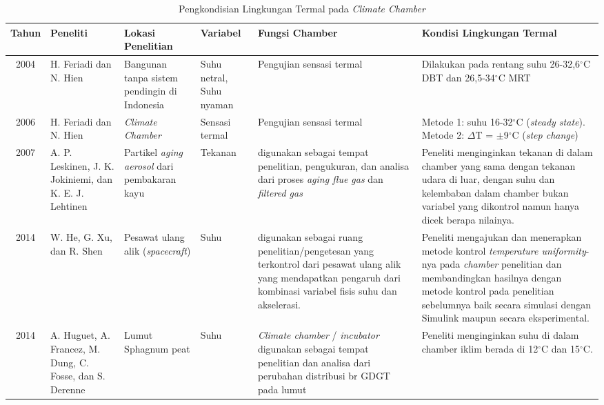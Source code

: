 \begin{landscape}
	\begin{table}[t]
		\caption{Pengkondisian Lingkungan Termal pada \textit{Climate Chamber}}
		\centering
		\label{tbl:2:studichamber}
		\begin{tabular}{|c|p{2.6cm}|p{3cm}|p{2.3cm}|p{5.5cm}|p{5.5cm}|}
			\hline
			Tahun & Peneliti & Lokasi Penelitian & Variabel & Fungsi Chamber & Kondisi Lingkungan Termal \\ \hline
			
			2004 \cite{article2.1:1} & H. Feriadi dan N. Hien & Bangunan tanpa sistem pendingin di Indonesia & Suhu netral, Suhu nyaman & Pengujian sensasi termal & Dilakukan pada rentang suhu 26-32,6$^{\circ}$C DBT dan 26,5-34$^{\circ}$C MRT \\ \hline
			
			2006 \cite{article2.1:2} & H. Feriadi dan N. Hien & \textit{Climate Chamber} & Sensasi termal & Pengujian sensasi termal & Metode 1: suhu 16-32$^{\circ}$C (\textit{steady state}). Metode 2: $\Delta$T = $\pm$9$^{\circ}$C (\textit{step change}) \\ \hline
			
			2007 \cite{article2.1:4} & A. P. Leskinen, J. K. Jokiniemi, dan K. E. J. Lehtinen & Partikel \textit{aging aerosol} dari pembakaran kayu & Tekanan & digunakan sebagai tempat penelitian, pengukuran, dan analisa dari proses \textit{aging flue gas} dan \textit{filtered gas} & Peneliti menginginkan tekanan di dalam chamber yang sama dengan tekanan udara di luar, dengan suhu dan kelembaban dalam chamber bukan variabel yang dikontrol namun hanya dicek berapa nilainya. \\ \hline
			
			2014 \cite{article2.1:5} & W. He, G. Xu, dan R. Shen & Pesawat ulang alik (\textit{spacecraft}) & Suhu & digunakan sebagai ruang penelitian/pengetesan yang terkontrol dari pesawat ulang alik yang mendapatkan pengaruh dari kombinasi variabel fisis suhu dan akselerasi. & Peneliti mengajukan dan menerapkan metode kontrol \textit{temperature uniformity}-nya pada \textit{chamber} penelitian dan membandingkan hasilnya dengan metode kontrol pada penelitian sebelumnya baik secara simulasi dengan Simulink maupun secara eksperimental. \\ \hline
			
			2014 \cite{article2.1:6} & A. Huguet, A. Francez, M. Dung, C. Fosse, dan S. Derenne & Lumut Sphagnum peat & Suhu & \textit{Climate chamber} / \textit{incubator} digunakan sebagai tempat penelitian dan analisa dari perubahan distribusi br GDGT pada lumut & Peneliti menginginkan suhu di dalam chamber iklim berada di 12$^{\circ}$C dan 15$^{\circ}$C. \\ \hline
		\end{tabular}
	\end{table}
\end{landscape}

